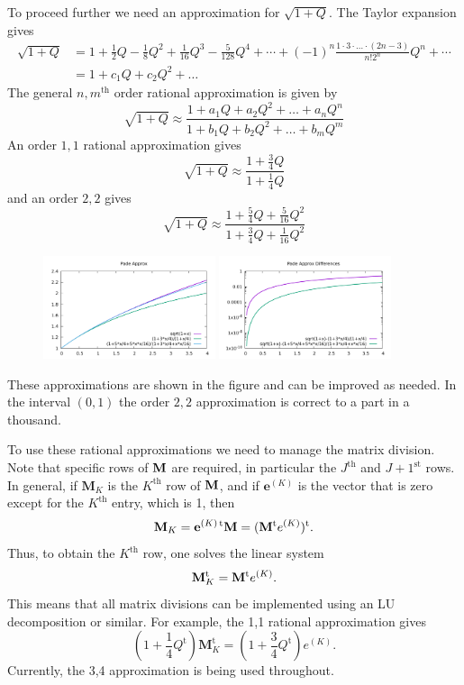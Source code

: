 To proceed further we need an approximation for $\sqrt{1+Q}$. The Taylor expansion gives
\[\begin{aligned}
\sqrt{1+Q}
&=
1+\frac{1}{2}Q-\frac{1}{8}Q^2+\frac{1}{16}Q^3-\frac{5}{128}Q^4
+\cdots+(-1)^n\frac{1\cdot 3\cdot\ldots\cdot (2n-3)}{n!2^n}Q^n+\cdots\\
&= 1+c_1 Q+c_2 Q^2+\dots
\end{aligned}\]
The general $n,m^\text{th}$ order rational approximation is given by 
\[
\sqrt{1+Q}\approx\frac{1+a_1Q+a_2Q^2+\dots+a_nQ^n}{1+b_1Q+b_2Q^2+\dots+b_mQ^m}
\]
An order $1,1$ rational approximation gives
\[
\sqrt{1+Q}\approx\frac{1+\frac{3}{4}Q}{1+\frac{1}{4}Q}
\]
and an order $2,2$ gives 
\[
\sqrt{1+Q}\approx\frac{1+\frac{5}{4}Q+\frac{5}{16}Q^2}{1+\frac{3}{4}Q+\frac{1}{16}Q^2}
\]
\begin{figure}[h]
  \centering
  \includegraphics[width=0.45\textwidth]{figs/sqrt_approx.pdf}
  \includegraphics[width=0.45\textwidth]{figs/sqrt_approx_errors.pdf}
\end{figure} 
These approximations are shown in the figure and can be improved as needed. In the interval $(0,1)$ the order $2,2$ approximation is correct to a part in a thousand. 

To use these rational approximations we need to manage the matrix division. Note that specific rows of ${\bf M}$ are required, in particular the $J^\text{th}$ and $J+1^\text{st}$ rows. In general, if $\mathbf M_K$ is the $K^\text{th}$ row of ${\bf M}$, and if $\mathbf e^{(K)}$ is the vector that is zero except for the $K^\text{th}$ entry, which is 1, then 
\[
\mathbf M_K=\mathbf e^{(K)\, \text{t}}{\bf M}=({\bf M}^\text{t}e^{(K)})^\text{t}. 
\]
Thus, to obtain the $K^\text{th}$ row, one solves the linear system 
\[
\mathbf M_K^\text{t}={\bf M}^\text{t}e^{(K)}. 
\]
This means that all matrix divisions can be implemented using an LU decomposition or similar. For example, the 1,1 rational approximation gives 
\[
(1+\frac{1}{4}Q^\text{t})\mathbf M_K^\text{t}=(1+\frac{3}{4}Q^\text{t})e^{(K)}.
\]
Currently, the 3,4 approximation is being used throughout. 


